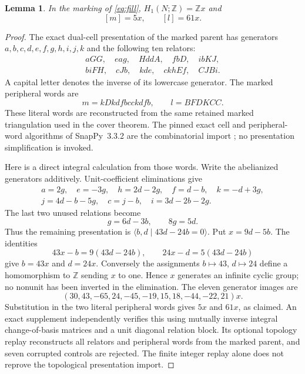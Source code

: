 \documentclass[11pt]{article}
\newtheorem{lemma}[theorem]{Lemma}
\newcommand{\Z}{\mathbb Z}
\begin{document}
\begin{lemma}\label{lem:parent}
In the marking of \eqref{eq:fill}, $H_1(N;\Z)=\Z x$ and
\[
                         [m]=5x,\qquad [l]=61x.
\]
\end{lemma}
\begin{proof}
The exact dual-cell presentation of the marked parent has generators
$a,b,c,d,e,f,g,h,i,j,k$ and the following ten relators:
\[
\begin{gathered}
 aGG,\quad eag,\quad HddA,\quad fbD,\quad ibKJ,\\
 biFH,\quad cJb,\quad kde,\quad ckhEf,\quad CJBi.
\end{gathered}
\]
A capital letter denotes the inverse of its lowercase generator.
The marked peripheral words are
\[
                       m=kDkdfbcckdfb,\qquad l=BFDKCC.
\]
These literal words are reconstructed from the same retained marked
triangulation used in the cover theorem. The pinned exact cell and
peripheral-word algorithms of SnapPy~3.3.2 are the combinatorial
import \cite{snappy}; no presentation simplification is invoked.

Here is a direct integral calculation from those words. Write the
abelianized generators additively. Unit-coefficient eliminations give
\[
\begin{gathered}
 a=2g,\quad e=-3g,\quad h=2d-2g,\quad f=d-b,\quad k=-d+3g,\\
 j=4d-b-5g,\quad c=j-b,\quad i=3d-2b-2g.
\end{gathered}
\]
The last two unused relations become
\[
                     g=6d-3b,\qquad 8g=5d.
\]
Thus the remaining presentation is
$\langle b,d\mid 43d-24b=0\rangle$.
Put $x=9d-5b$. The identities
\[
 43x-b=9(43d-24b),\qquad 24x-d=5(43d-24b)
\]
give $b=43x$ and $d=24x$. Conversely the assignments $b\mapsto43$,
$d\mapsto24$ define a homomorphism to $\Z$ sending $x$ to one.
Hence $x$ generates an infinite cyclic group; no nonunit has been
inverted in the elimination. The eleven generator images are
\[
 (30,43,-65,24,-45,-19,15,18,-44,-22,21)x.
\]
Substitution in the two literal peripheral words gives $5x$ and
$61x$, as claimed.
An exact supplement independently verifies this using mutually inverse
integral change-of-basis matrices and a unit diagonal relation block.
Its optional topology replay reconstructs all relators and peripheral
words from the marked parent, and seven corrupted controls are rejected.
The finite integer replay alone does not reprove the topological
presentation import.
\end{proof}
\end{document}
